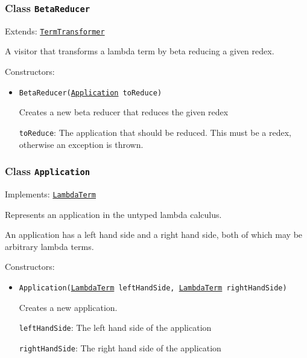 \subsubsection{Class \texttt{BetaReducer}}
\label{type:edu.kit.wavelength.client.model.term.BetaReducer}
Extends: \texttt{\hyperref[type:edu.kit.wavelength.client.model.term.TermTransformer]{TermTransformer}}

A visitor that transforms a lambda term by beta reducing a given
 redex.

Constructors:
\begin{itemize}
\item \texttt{BetaReducer(\hyperref[type:edu.kit.wavelength.client.model.term.Application]{Application} toReduce)}

Creates a new beta reducer that reduces the given redex

\texttt{toReduce}: The application that should be reduced.
 This must be a redex, otherwise an exception is thrown.

\end{itemize}

\subsubsection{Class \texttt{Application}}
\label{type:edu.kit.wavelength.client.model.term.Application}
Implements: \texttt{\hyperref[type:edu.kit.wavelength.client.model.term.LambdaTerm]{LambdaTerm}}

Represents an application in the untyped lambda calculus.
 
 An application has a left hand side and a right hand side,
 both of which may be arbitrary lambda terms.

Constructors:
\begin{itemize}
\item \texttt{Application(\hyperref[type:edu.kit.wavelength.client.model.term.LambdaTerm]{LambdaTerm} leftHandSide, \hyperref[type:edu.kit.wavelength.client.model.term.LambdaTerm]{LambdaTerm} rightHandSide)}

Creates a new application.

\texttt{leftHandSide}: The left hand side of the application

\texttt{rightHandSide}: The right hand side of the application

\end{itemize}

